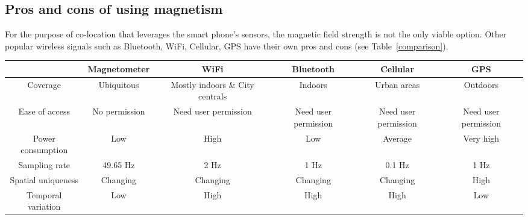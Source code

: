 \documentclass[conference]{IEEEtran}
\begin{document}
\subsection{Pros and cons of using magnetism}
For the purpose of co-location that leverages the smart phone's sensors, the magnetic field strength is not the only viable option. Other popular wireless signals such as Bluetooth, WiFi, Cellular, GPS have their own pros and cons (see Table~\ref{comparison}). 
\begin{table*}
	\caption{Comparison of smart phone's sensors for co-location purpose.}
	\centering 
	\begin{tabular}{| c | c | c | c | c | c |} %
		\hline\hline %
		& \textbf{Magnetometer} & \textbf{WiFi} & \textbf{Bluetooth} & \textbf{Cellular} & \textbf{GPS} \\ [0.5ex] %
		\hline %
		Coverage & Ubiquitous & Mostly indoors \& City centrals & Indoors & Urban areas & Outdoors \\
		Ease of access & No permission & Need user permission & Need user permission & Need user permission & Need user permission \\
		Power consumption & Low & High & Low & Average & Very high \\
		Sampling rate & 49.65 Hz & 2 Hz & 1 Hz & 0.1 Hz & 1 Hz  \\
		Spatial uniqueness & Changing & Changing & Changing & Changing & High \\
		Temporal variation & Low & High & High & High & Low \\
		\hline %
	\end{tabular}
	\label{comparison}
\end{table*}
\end{document}
